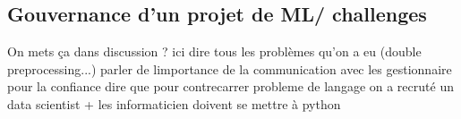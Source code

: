 \subsection{Gouvernance d'un projet de ML/ challenges}

On mets ça dans discussion ?
ici dire tous les problèmes qu'on a eu (double preprocessing...)
parler de limportance de la communication avec les gestionnaire pour la confiance
dire que pour contrecarrer probleme de langage on a recruté un data scientist + les informaticien doivent se mettre à python

